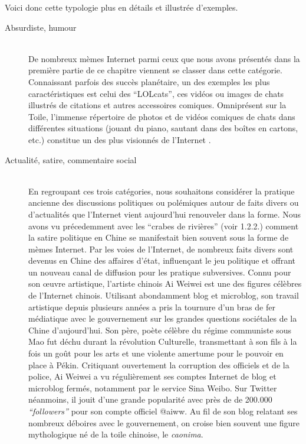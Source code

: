 Voici donc cette typologie plus en détails et illustrée d{\textquoteright}exemples. 


\begin{description}

\item[Absurdiste, humour]
\hfill \\
De nombreux mèmes Internet parmi ceux que nous avons présentés dans la première partie de ce chapitre viennent se classer dans cette catégorie. Connaissant parfois des succès planétaire, un des exemples les plus caractéristiques est celui des {\textquotedblleft}LOLcats{\textquotedblright}, ces vidéos ou images de chats illustrés de citations et autres accessoires comiques. Omniprésent sur la Toile, l{\textquoteright}immense répertoire de photos et de vidéos comiques de chats dans différentes situations (jouant du piano, sautant dans des bo\^ites en cartons, etc.) constitue un des plus visionnés de l{\textquoteright}Internet \citep{Bauckhage2011}. 

\item[Actualité, satire, commentaire social]
\hfill \\
En regroupant ces trois catégories, nous souhaitons considérer la pratique ancienne des discussions politiques ou polémiques autour de faits divers ou d{\textquoteright}actualités que l{\textquoteright}Internet vient aujourd{\textquoteright}hui renouveler dans la forme. Nous avons vu précedemment avec les {\textquotedblleft}crabes de rivières{\textquotedblright} (voir 1.2.2.) \textcolor[rgb]{0.0,0.0,0.039215688}{comment la satire politique en Chine se manifestait bien souvent sous la forme de mèmes Internet. Par les voies de l{\textquoteright}Internet, }de nombreux faits divers sont devenus en Chine des affaires d{\textquoteright}état, influen\c{c}ant le jeu politique et offrant un nouveau canal de diffusion pour les pratique subversives. Connu pour son {\oe}uvre artistique, l{\textquoteright}artiste chinois Ai Weiwei est une des figures célèbres de l{\textquoteright}Internet chinois. Utilisant abondamment blog et microblog, son travail artistique depuis plusieurs années a pris la tournure d{\textquoteright}un bras de fer médiatique avec le gouvernement sur les grandes questions sociétales de la Chine d{\textquoteright}aujourd{\textquoteright}hui. Son père, poète célèbre du régime communiste sous Mao fut déchu durant la révolution Culturelle, transmettant à son fils à la fois un go\^ut pour les arts et une violente amertume pour le pouvoir en place à Pékin. Critiquant ouvertement la corruption des officiels et de la police, Ai Weiwei a vu régulièrement ses comptes Internet de blog et microblog fermés, notamment par le service Sina Weibo. Sur Twitter néanmoins, il jouit d{\textquoteright}une grande popularité avec près de de 200.000 \textit{{\textquotedblleft}followers{\textquotedblright}} pour son compte officiel @aiww. Au fil de son blog relatant ses nombreux déboires avec le gouvernement, on croise bien souvent une figure mythologique né de la toile chinoise, le \textit{caonima}.  


\end{description}
